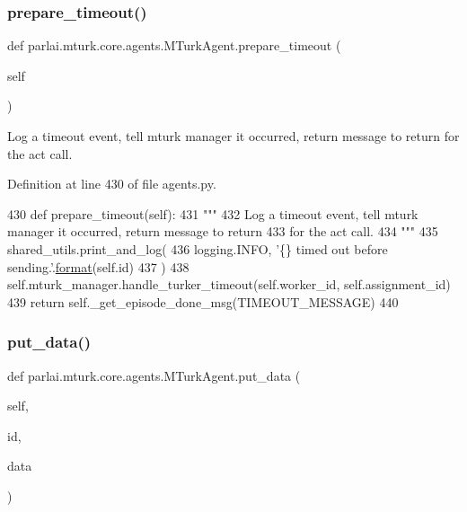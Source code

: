 \subsubsection{\texorpdfstring{prepare\+\_\+timeout()}{prepare\_timeout()}}
{\footnotesize\ttfamily def parlai.\+mturk.\+core.\+agents.\+M\+Turk\+Agent.\+prepare\+\_\+timeout (\begin{DoxyParamCaption}\item[{}]{self }\end{DoxyParamCaption})}

\begin{DoxyVerb}Log a timeout event, tell mturk manager it occurred, return message to return
for the act call.
\end{DoxyVerb}
 

Definition at line 430 of file agents.\+py.


\begin{DoxyCode}
430     \textcolor{keyword}{def }prepare\_timeout(self):
431         \textcolor{stringliteral}{"""}
432 \textcolor{stringliteral}{        Log a timeout event, tell mturk manager it occurred, return message to return}
433 \textcolor{stringliteral}{        for the act call.}
434 \textcolor{stringliteral}{        """}
435         shared\_utils.print\_and\_log(
436             logging.INFO, \textcolor{stringliteral}{'\{\} timed out before sending.'}.\hyperlink{namespaceparlai_1_1chat__service_1_1services_1_1messenger_1_1shared__utils_a32e2e2022b824fbaf80c747160b52a76}{format}(self.id)
437         )
438         self.mturk\_manager.handle\_turker\_timeout(self.worker\_id, self.assignment\_id)
439         \textcolor{keywordflow}{return} self.\_get\_episode\_done\_msg(TIMEOUT\_MESSAGE)
440 
\end{DoxyCode}
\mbox{\label{classparlai_1_1mturk_1_1core_1_1agents_1_1MTurkAgent_a99af17351b0e8dd9b8c091bda19bd9af}} 
\subsubsection{\texorpdfstring{put\+\_\+data()}{put\_data()}}
{\footnotesize\ttfamily def parlai.\+mturk.\+core.\+agents.\+M\+Turk\+Agent.\+put\+\_\+data (\begin{DoxyParamCaption}\item[{}]{self,  }\item[{}]{id,  }\item[{}]{data }\end{DoxyParamCaption})}

